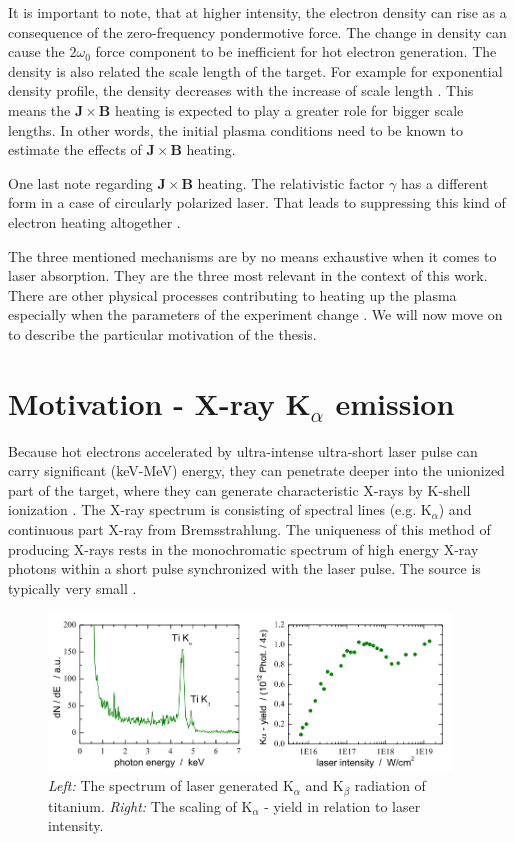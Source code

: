 It is important to note, that at higher intensity, the electron density can rise as a consequence of the zero-frequency pondermotive force. The change in density can cause the $2\omega_0$ force component to be inefficient for hot electron generation. The density is also related the scale length of the target. For example for exponential density profile, the density decreases with the increase of scale length \cite{cai2006}. This means the $\bm{J}\times \bm{B}$ heating is expected to play a greater role for bigger scale lengths. In other words, the initial plasma conditions need to be known to estimate the effects of $\bm{J}\times \bm{B}$ heating.

One last note regarding $\bm{J}\times \bm{B}$ heating. The relativistic factor $\gamma$ has a different form in a case of circularly polarized laser. That leads to suppressing this kind of electron heating altogether \cite{cai2006}.


The three mentioned mechanisms are by no means exhaustive when it comes to laser absorption. They are the three most relevant in the context of this work. There are other physical processes contributing to heating up the plasma especially when the parameters of the experiment change \cite{absorption1}. We will now move on to describe the particular motivation of the thesis.

\section{Motivation - X-ray $\mathbf{K}_\alpha$ emission}
Because hot electrons accelerated by ultra-intense ultra-short laser pulse can carry significant (keV-MeV) energy, they can penetrate deeper into the unionized part of the target, where they can generate characteristic X-rays by K-shell ionization \cite{reich2000}. The X-ray spectrum is consisting of spectral lines (e.g. $\mathrm{K}_\alpha$) and continuous part X-ray from Bremsstrahlung. The uniqueness of this method of producing X-rays rests in the monochromatic spectrum of high energy X-ray photons within a short pulse synchronized with the laser pulse. The source is typically very small \cite{pfeifer2006}.

\begin{figure}[h]
	\centering
	\includegraphics[width=0.95\textwidth]{figures/spectrum-ti}
	\caption{\textit{Left:} The spectrum of laser generated $\mathrm{K}_\alpha$ and $\mathrm{K}_\beta$ radiation of titanium. \textit{Right:} The scaling of $\mathrm{K}_\alpha$ - yield in relation to laser intensity. \cite{schwoerer2004}}
	\label{fig:ti-spectrum}
\end{figure}

